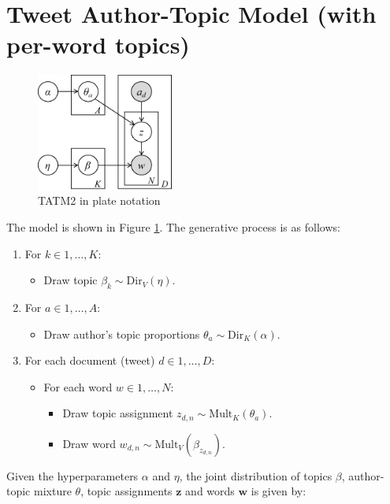 \section{Tweet Author-Topic Model (with per-word topics)}

\begin{figure}[tb]
    \centering
    \includegraphics[width=0.4\textwidth]{TATM2.eps}
    \caption{TATM2 in plate notation}
    \label{fig:TATM2}
\end{figure}

The model is shown in Figure \ref{fig:TATM2}. The generative process is as follows:

\begin{enumerate}
	\item For $k \in {1, \ldots, K}$:
	\begin{itemize}
		\item Draw topic $\beta_k \sim \text{Dir}_V(\eta)$.
	\end{itemize}
	\item For $a \in {1, \ldots, A}$:
	\begin{itemize}
		\item Draw author's topic proportions $\theta_a \sim \text{Dir}_K(\alpha)$.
	\end{itemize}
  \item For each document (tweet) $d \in {1, \ldots, D}$:
	\begin{itemize}
		\item For each word $w \in {1, \ldots, N}$:
		\begin{itemize}
			\item Draw topic assignment $z_{d,n} \sim \text{Mult}_K(\theta_a)$.
			\item Draw word $w_{d,n} \sim \text{Mult}_V(\beta_{z_{d,n}})$.
		\end{itemize}
	\end{itemize}
\end{enumerate}


Given the hyperparameters $\alpha$ and $\eta$, the joint distribution of topics $\beta$, author-topic mixture $\theta$, topic assignments $\mathbf{z}$ and words $\mathbf{w}$ is given by:

